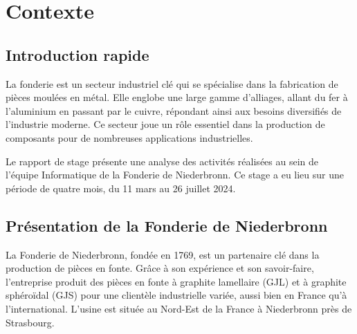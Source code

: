 \documentclass[12pt]{article}
\begin{document}
\newpage

\tableofcontents

\newpage




    





\section{Contexte }


\subsection{Introduction rapide}


La fonderie est un secteur industriel clé qui se spécialise dans la 
fabrication de pièces moulées en métal. Elle englobe une large gamme 
d'alliages, allant du fer à l'aluminium en passant par le cuivre, 
répondant ainsi aux besoins diversifiés de l'industrie moderne. 
Ce secteur joue un rôle essentiel dans la production de composants 
pour de nombreuses applications industrielles.

Le rapport de stage présente une analyse des activités réalisées 
au sein de l'équipe Informatique de la Fonderie de Niederbronn. Ce stage 
a eu lieu sur une période de quatre mois, du 11 mars au 26 juillet 2024. 



\subsection{Présentation de la Fonderie de Niederbronn}


La Fonderie de Niederbronn, fondée en 1769, est un partenaire clé dans la production de pièces 
en fonte. Grâce à son expérience et son savoir-faire, l'entreprise produit des pièces en fonte 
à graphite lamellaire (GJL) et à graphite sphéroïdal (GJS) pour une clientèle industrielle variée,
aussi bien en France qu'à l'international. L’usine est située au Nord-Est de la France 
à Niederbronn près de Strasbourg.
\end{document}
